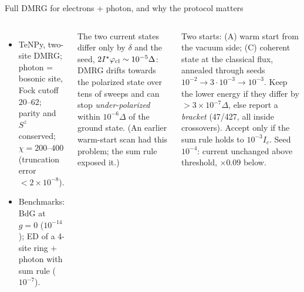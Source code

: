 \documentclass[aspectratio=169,9pt]{beamer}
\newcommand{\pcl}{\varphi_{\rm cl}}
\begin{document}
\begin{frame}{Full DMRG for electrons + photon, and why the protocol matters}
  \begin{columns}[c]
    \centering
    \begin{itemize}\footnotesize
      \item TeNPy, two-site DMRG; photon = bosonic site, Fock cutoff $20$--$62$; parity and $S^z$ conserved;
            $\chi=200$--$400$ (truncation error $<2\times10^{-8}$).
      \item Benchmarks: BdG at $g=0$ ($10^{-14}$); ED of a 4-site ring + photon with sum rule ($10^{-7}$).
    \end{itemize}
    \begin{warnbox}[title={The energy is not the criterion}]
      \footnotesize The two current states differ only by $\delta$ and the seed, $2I^\star\pcl\sim10^{-5}\Delta$: DMRG
      drifts towards the polarized state over tens of sweeps and can stop \emph{under-polarized} within $10^{-6}\Delta$
      of the ground state. (An earlier warm-start scan had this problem; the sum rule exposed it.)
    \end{warnbox}
    \begin{keybox}[title={Protocol for every seeded point}]
      \footnotesize Two starts: (A) warm start from the vacuum side; (C) coherent state at the classical flux, annealed
      through seeds $10^{-2}\to3\cdot10^{-3}\to10^{-3}$. Keep the lower energy if they differ by $>3\times10^{-7}\Delta$,
      else report a \emph{bracket} (47/427, all inside crossovers). Accept only if the sum rule holds to $10^{-3}I_c$.
      Seed $10^{-4}$: current unchanged above threshold, $\times0.09$ below.
    \end{keybox}
  \end{columns}
\end{frame}
\end{document}

